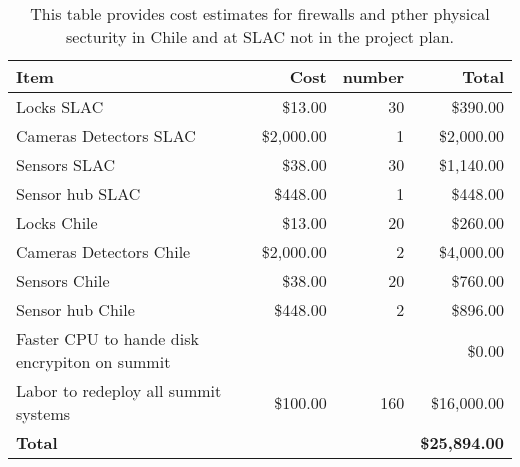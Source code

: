 \tiny \begin{longtable} {|p{}|r|r|r|} \caption{This table provides cost estimates for firewalls and pther physical secturity in Chile and at SLAC not in the project plan. \label{tab:firewalls}}\\ 
\hline 
\textbf{Item}&\textbf{Cost}&\textbf{number}&\textbf{Total} \\ \hline
{Locks SLAC}&{\$13.00}&{30}&{\$390.00} \\ \hline
{Cameras Detectors  SLAC}&{\$2,000.00}&{1}&{\$2,000.00} \\ \hline
{Sensors SLAC}&{\$38.00}&{30}&{\$1,140.00} \\ \hline
{Sensor hub SLAC}&{\$448.00}&{1}&{\$448.00} \\ \hline
{Locks Chile}&{\$13.00}&{20}&{\$260.00} \\ \hline
{Cameras Detectors Chile}&{\$2,000.00}&{2}&{\$4,000.00} \\ \hline
{Sensors Chile}&{\$38.00}&{20}&{\$760.00} \\ \hline
{Sensor hub Chile}&{\$448.00}&{2}&{\$896.00} \\ \hline
{Faster CPU to hande disk encrypiton on summit}&{}&{}&{\$0.00} \\ \hline
{Labor to redeploy all summit systems}&{\$100.00}&{160}&{\$16,000.00} \\ \hline
\textbf{Total }&\textbf{}&\textbf{}&\textbf{\$25,894.00} \\ \hline
\end{longtable} \normalsize
